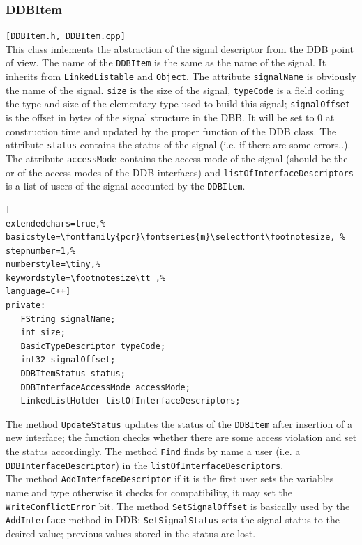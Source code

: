 \subsubsection{DDBItem}
\texttt{[DDBItem.h, DDBItem.cpp]}\\
This class imlements the abstraction of the signal descriptor from the DDB point of view. The name of the \texttt{DDBItem} is the same as the name of the signal. It inherits from \texttt{LinkedListable} and \texttt{Object}. The attribute \texttt{signalName} is obviously the name of the signal. \texttt{size} is the size of the signal, \texttt{typeCode} is a field coding the type and size of the elementary type used to build this signal; \texttt{signalOffset} is the offset in bytes of the signal structure in the DBB. It will be set to 0 at construction time and updated by the proper function of the DDB class.
The attribute \texttt{status} contains the status of the signal (i.e. if there are some errors..).
The attribute \texttt{accessMode} contains the access mode of the signal (should be the or of the access modes of the DDB interfaces) and \texttt{listOfInterfaceDescriptors} is a list of users of the signal accounted by the \texttt{DDBItem}.

\begin{lstlisting}[
extendedchars=true,%
basicstyle=\fontfamily{pcr}\fontseries{m}\selectfont\footnotesize, %
stepnumber=1,%
numberstyle=\tiny,%
keywordstyle=\footnotesize\tt ,%
language=C++]
private:
   FString signalName;
   int size;
   BasicTypeDescriptor typeCode;
   int32 signalOffset;
   DDBItemStatus status;
   DDBInterfaceAccessMode accessMode;
   LinkedListHolder listOfInterfaceDescriptors;
\end{lstlisting}

The method \texttt{UpdateStatus} updates the status of the \texttt{DDBItem} after insertion of a new interface; the function checks whether there are some access violation and set the status accordingly.
The method \texttt{Find} finds by name a user (i.e. a \texttt{DDBInterfaceDescriptor}) in the \texttt{listOfInterfaceDescriptors}. \\


The method \texttt{AddInterfaceDescriptor} if it is the first user sets the variables name and type otherwise it checks for compatibility, it may set the \texttt{WriteConflictError} bit.
The method \texttt{SetSignalOffset} is basically used by the \texttt{AddInterface} method in DDB; \texttt{SetSignalStatus} sets the signal status to the desired value; previous values stored in the status are lost. \\


